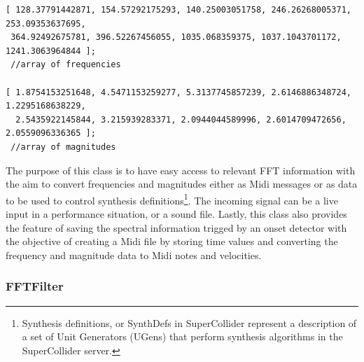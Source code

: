 \begin{verbatim}
[ 128.37791442871, 154.57292175293, 140.25003051758, 246.26268005371, 253.09353637695,
 364.92492675781, 396.52267456055, 1035.068359375, 1037.1043701172, 1241.3063964844 ]; 
 //array of frequencies

[ 1.8754153251648, 4.5471153259277, 5.3137745857239, 2.6146886348724, 1.2295168638229,
  2.5435922145844, 3.215939283371, 2.0944044589996, 2.6014709472656, 2.0559096336365 ]; 
 //array of magnitudes
\end{verbatim}
The purpose of this class is to have easy access to relevant FFT information with the aim to convert frequencies and magnitudes either as Midi messages or as data to be used to control synthesis definitions\footnote{Synthesis definitions, or SynthDefs in SuperCollider represent a description of a set of Unit Generators (UGens) that perform synthesis algorithms in the SuperCollider server.}. The incoming signal can be a live input in a performance situation, or a sound file. Lastly, this class also provides the feature of saving the spectral information trigged by an onset detector with the objective of  creating a Midi file by storing time values and converting the frequency and magnitude data to Midi notes and velocities.

\subsubsection{FFTFilter}

